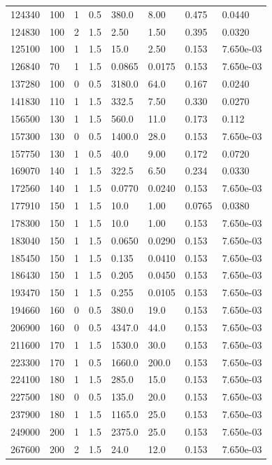 \documentclass[preview]{standalone}
\begin{document}
{{\begin{tabular}{L{1.2cm}C{1.2cm} C{0.3cm}C{0.5cm} C{1.4cm}C{1.4cm} C{1.4cm}C{1.4cm}}
  124340  &   100  & 1     & 0.5 &  380.0  & 8.00  & 0.475 &  0.0440   \\ 
  124830  &   100  & 2     & 1.5 &  2.50  & 1.50  & 0.395 &  0.0320   \\ 
  125100  &   100  & 1     & 1.5 &  15.0  & 2.50  & 0.153 &  7.650e-03   \\ 
  126840  &    70  & 1     & 1.5 &  0.0865  & 0.0175  & 0.153 &  7.650e-03   \\ 
  137280  &   100  & 0     & 0.5 &  3180.0  & 64.0  & 0.167 &  0.0240   \\ 
  141830  &   110  & 1     & 1.5 &  332.5  & 7.50  & 0.330 &  0.0270   \\ 
  156500  &   130  & 1     & 1.5 &  560.0  & 11.0  & 0.173 &  0.112   \\ 
  157300  &   130  & 0     & 0.5 &  1400.0  & 28.0  & 0.153 &  7.650e-03   \\ 
  157750  &   130  & 1     & 0.5 &  40.0  & 9.00  & 0.172 &  0.0720   \\ 
  169070  &   140  & 1     & 1.5 &  322.5  & 6.50  & 0.234 &  0.0330   \\ 
  172560  &   140  & 1     & 1.5 &  0.0770  & 0.0240  & 0.153 &  7.650e-03   \\ 
  177910  &   150  & 1     & 1.5 &  10.0  & 1.00  & 0.0765 &  0.0380   \\ 
  178300  &   150  & 1     & 1.5 &  10.0  & 1.00  & 0.153 &  7.650e-03   \\ 
  183040  &   150  & 1     & 1.5 &  0.0650  & 0.0290  & 0.153 &  7.650e-03   \\ 
  185450  &   150  & 1     & 1.5 &  0.135  & 0.0410  & 0.153 &  7.650e-03   \\ 
  186430  &   150  & 1     & 1.5 &  0.205  & 0.0450  & 0.153 &  7.650e-03   \\ 
  193470  &   150  & 1     & 1.5 &  0.255  & 0.0105  & 0.153 &  7.650e-03   \\ 
  194660  &   160  & 0     & 0.5 &  380.0  & 19.0  & 0.153 &  7.650e-03   \\ 
  206900  &   160  & 0     & 0.5 &  4347.0  & 44.0  & 0.153 &  7.650e-03   \\ 
  211600  &   170  & 1     & 1.5 &  1530.0  & 30.0  & 0.153 &  7.650e-03   \\ 
  223300  &   170  & 1     & 0.5 &  1660.0  & 200.0  & 0.153 &  7.650e-03   \\ 
  224100  &   180  & 1     & 1.5 &  285.0  & 15.0  & 0.153 &  7.650e-03   \\ 
  227500  &   180  & 0     & 0.5 &  135.0  & 20.0  & 0.153 &  7.650e-03   \\ 
  237900  &   180  & 1     & 1.5 &  1165.0  & 25.0  & 0.153 &  7.650e-03   \\ 
  249000  &   200  & 1     & 1.5 &  2375.0  & 25.0  & 0.153 &  7.650e-03   \\ 
  267600  &   200  & 2     & 1.5 &  24.0  & 12.0  & 0.153 &  7.650e-03   \\ 
\hline 
\end{tabular} 

}}
\end{document}
